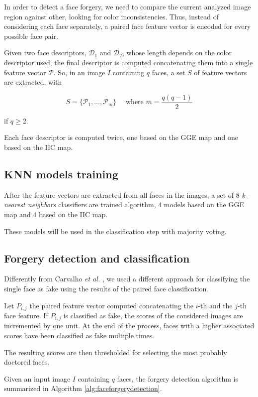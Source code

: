In order to detect a face forgery, we need to compare  the current analyzed image region against other, looking for color inconsistencies. Thus, instead of considering each face separately, a paired face feature vector is encoded for every possible face pair.

Given two face descriptors, $\mathcal{D_1}$ and $\mathcal{D_2}$, whose length depends on the color descriptor used, the final descriptor is computed concatenating them into a single feature vector $\mathcal{P}$. So, in an image $I$ containing $q$ faces, a set $S$ of feature vectors are extracted, with

$$
S = \{\mathcal{P}_1, \ldots, \mathcal{P}_m\} \quad \textrm{  where } m = \frac{q (q-1)}{2}
$$

if $q \geq 2$. 

Each face descriptor is computed twice, one based on the GGE map and one based on the IIC map.

\subsection{KNN models training}

After the feature vectors are extracted from all faces in the images, a set of 8 \emph{k-nearest neighbors} classifiers are trained algorithm, 4 models based on the GGE map and 4 based on the IIC map. 

These models will be used in the classification step with majority voting.

\subsection{Forgery detection and classification}

Differently from Carvalho \emph{et al.} \cite{carvalho2016illuminant}, we used a different approach for classifying the single face as fake using the results of the paired face classification. 

Let $P_{i, j}$ the paired feature vector computed concatenating the $i$-th and the $j$-th face feature. If $P_{i, j}$ is classified as fake, the scores of the considered images are incremented by one unit. At the end of the process, faces with a higher associated scores have been classified as fake multiple times.

The resulting scores are then thresholded for selecting the most probably doctored faces. 

Given an input image $I$ containing $q$ faces, the forgery detection algorithm is summarized in Algorithm \ref{alg:faceforgerydetection}.

